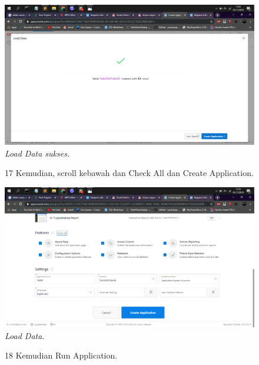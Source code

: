 \begin{enumerate}
\begin{figure}
    \begin{center}
\includegraphics[scale=0.2]{figures/15.png}
    \caption{\textit{Load Data sukses.}}
        \end{center}
\label{gambar}
\end{figure}

\begin{figure}
\item[17] Kemudian, scroll kebawah dan Check All dan Create Application. 

    \begin{center}
\includegraphics[scale=0.2]{figures/16.png}
    \caption{\textit{Load Data.}}
        \end{center}
\label{gambar}
\end{figure}

\begin{figure}
\item[18] Kemudian Run Application.


\end{figure}
\end{enumerate}
